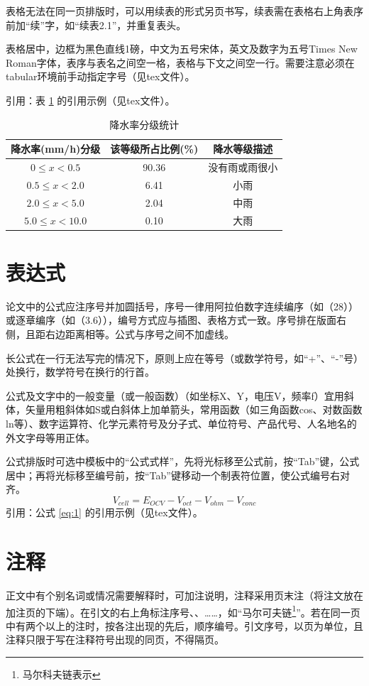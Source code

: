 \documentclass[fandol]{seuthesis-2022}
\begin{document}
表格无法在同一页排版时，可以用续表的形式另页书写，续表需在表格右上角表序前加“续”字，如“续表2.1”，并重复表头。

表格居中，边框为黑色直线1磅，中文为五号宋体，英文及数字为五号Times New Roman字体，表序与表名之间空一格，表格与下文之间空一行。需要注意必须在tabular环境前手动指定字号（见tex文件）。

引用：表 \ref{tab:1} 的引用示例（见tex文件）。

\begin{table}[H]
  \centering
  \caption{降水率分级统计}
  \label{tab:1}
  \small
  \begin{tabular}{ccc}
    \toprule
    降水率(mm/h)分级 & 该等级所占比例(\%) & 降水等级描述\\
    \midrule
    $0\le x< 0.5$ & 90.36 & 没有雨或雨很小\\
    $0.5\le x< 2.0$ & 6.41 & 小雨\\
    $2.0\le x< 5.0$ & 2.04 & 中雨\\
    $5.0\le x< 10.0$ & 0.10 & 大雨\\
    \bottomrule
  \end{tabular}
\end{table}

\section{表达式}
论文中的公式应注序号并加圆括号，序号一律用阿拉伯数字连续编序（如（28））或逐章编序（如（3.6）），编号方式应与插图、表格方式一致。序号排在版面右侧，且距右边距离相等。公式与序号之间不加虚线。

长公式在一行无法写完的情况下，原则上应在等号（或数学符号，如“+”、“-”号）处换行，数学符号在换行的行首。

公式及文字中的一般变量（或一般函数）（如坐标X、Y，电压V，频率f）宜用斜体，矢量用粗斜体如S或白斜体上加单箭头，常用函数（如三角函数cos、对数函数ln等）、数字运算符、化学元素符号及分子式、单位符号、产品代号、人名地名的外文字母等用正体。

公式排版时可选中模板中的“公式式样”，先将光标移至公式前，按“Tab”键，公式居中；再将光标移至编号前，按“Tab”键移动一个制表符位置，使公式编号右对齐。
\begin{equation}\label{eq:1}
  V_{cell}=E_{OCV}-V_{oct}-V_{ohm}-V_{conc}
  \end{equation}
引用：公式 \eqref{eq:1} 的引用示例（见tex文件）。

  
\section{注释}
正文中有个别名词或情况需要解释时，可加注说明，注释采用页末注（将注文放在加注页的下端）。在引文的右上角标注序号、、……，如“马尔可夫链\footnote{马尔科夫链表示}”。若在同一页中有两个以上的注时，按各注出现的先后，顺序编号。引文序号，以页为单位，且注释只限于写在注释符号出现的同页，不得隔页。
\end{document}
